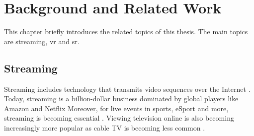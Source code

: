 
\chapter{Background and Related Work}\label{chapter:background}
This chapter briefly introduces the related topics of this thesis. The main topics are streaming, \gls{vr} and \gls{sr}.

\section{Streaming}\label{section:background_streaming}
Streaming includes technology that transmits video sequences over the Internet \parencite{Mok2011}. Today, streaming is a billion-dollar business dominated by global players like Amazon and Netflix \parencite{AMR2019} Moreover, for live events in sports, eSport and more, streaming is becoming essential \parencite{AMR2019}. Viewing television online is also becoming increasingly more popular as cable TV is becoming less common \parencite{CableTV}. 
\par
